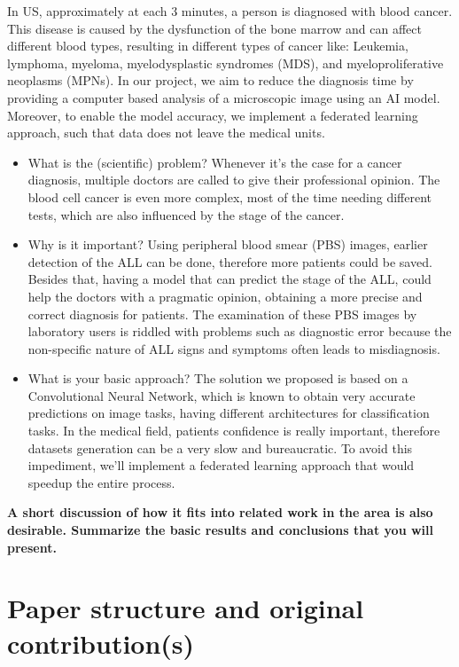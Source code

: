 \documentclass[runningheads,a4paper,11pt]{report}
\begin{document}
In US, approximately at each 3 minutes, a person is diagnosed with blood cancer. This disease is caused by the dysfunction of the bone marrow and can affect different blood types, resulting in different types of cancer like: Leukemia, lymphoma, myeloma, myelodysplastic syndromes (MDS), and myeloproliferative neoplasms (MPNs). In our project, we aim to reduce the diagnosis time by providing a computer based analysis of a microscopic image using an AI model. Moreover, to enable the model accuracy, we implement a federated learning approach, such that data does not leave the medical units.
\begin{itemize}
	\item What is the (scientific) problem? 
 Whenever it's the case for a cancer diagnosis, multiple doctors are called to give their professional opinion. The blood cell cancer is even more complex, most of the time needing different tests, which are also influenced by the stage of the cancer.  
	\item Why is it important? 
 Using peripheral blood smear (PBS) images, earlier detection of the ALL can be done, therefore more patients could be saved. Besides that, having a model that can predict the stage of the ALL, could help the doctors with a pragmatic opinion, obtaining a more precise and correct diagnosis for patients. The examination of these PBS images by laboratory users is riddled with problems such as diagnostic error because the non-specific nature of ALL signs and symptoms often leads to misdiagnosis.
	\item What is your basic approach? 
 The solution we proposed is based on a Convolutional Neural Network, which is known to obtain very accurate predictions on image tasks, having different architectures for classification tasks. In the medical field, patients confidence is really important, therefore datasets generation can be a very slow and bureaucratic. To avoid this impediment, we'll implement a federated learning approach that would speedup the entire process.
\end{itemize}

\textbf {A short discussion of how it fits into related work in the area is also desirable. Summarize the basic results and conclusions that you will present. }


\section{Paper structure and original contribution(s)}
\label{section:structure}
\end{document}
